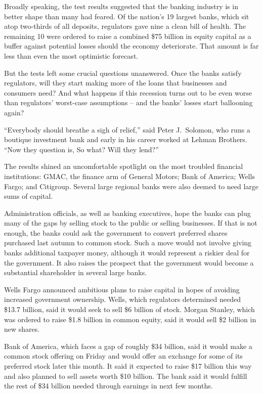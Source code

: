 \documentclass[12pt,a4paper,onecolumn]{article}
\begin{document}
Broadly speaking, the test results suggested that the banking industry is in better shape than many
had feared. Of the nation's 19 largest banks, which sit atop two-thirds of all deposits, regulators
gave nine a clean bill of health. The remaining 10 were ordered to raise a combined \$75 billion in
equity capital as a buffer against potential losses should the economy deteriorate. That amount is
far less than even the most optimistic forecast.

But the tests left some crucial questions unanswered. Once the banks satisfy regulators, will they
start making more of the loans that businesses and consumers need? And what happens if this
recession turns out to be even worse than regulators' worst-case assumptions -- and the banks'
losses start ballooning again?

``Everybody should breathe a sigh of relief,'' said Peter J.~Solomon, who runs a boutique investment
bank and early in his career worked at Lehman Brothers. ``Now they question is, So what? Will they
lend?''

The results shined an uncomfortable spotlight on the most troubled financial institutions: GMAC, the
finance arm of General Motors; Bank of America; Wells Fargo; and Citigroup. Several large regional
banks were also deemed to need large sums of capital.

Administration officials, as well as banking executives, hope the banks can plug many of the gaps by
selling stock to the public or selling businesses. If that is not enough, the banks could ask the
government to convert preferred shares purchased last autumn to common stock. Such a move would not
involve giving banks additional taxpayer money, although it would represent a riskier deal for the
government. It also raises the prospect that the government would become a substantial shareholder
in several large banks.

Wells Fargo announced ambitious plans to raise capital in hopes of avoiding increased government
ownership. Wells, which regulators determined needed \$13.7 billion, said it would seek to sell \$6
billion of stock. Morgan Stanley, which was ordered to raise \$1.8 billion in common equity, said it
would sell \$2 billion in new shares.

Bank of America, which faces a gap of roughly \$34 billion, said it would make a common stock
offering on Friday and would offer an exchange for some of its preferred stock later this month. It
said it expected to raise \$17 billion this way and also planned to sell assets worth \$10 billion.
The bank said it would fulfill the rest of \$34 billion needed through earnings in next few months.
\end{document}
